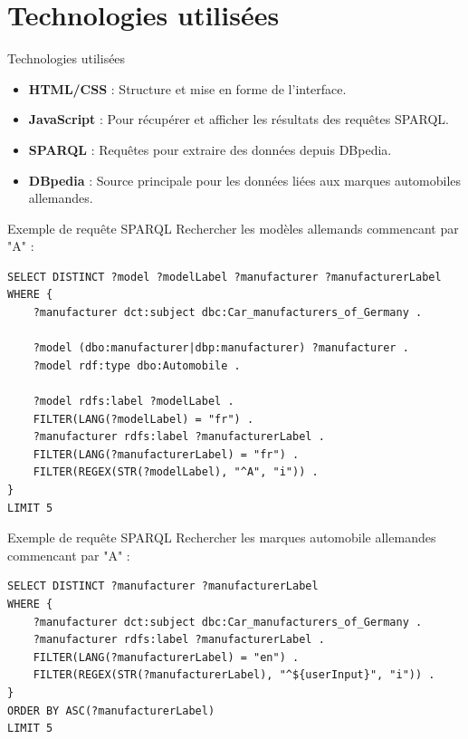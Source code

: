 \documentclass[10pt]{beamer}
\begin{document}
\section{Technologies utilisées}
\begin{frame}{Technologies utilisées}
\begin{itemize}
    \item \textbf{HTML/CSS} : Structure et mise en forme de l'interface.  
    \item \textbf{JavaScript} : Pour récupérer et afficher les résultats des requêtes SPARQL.  
    \item \textbf{SPARQL} : Requêtes pour extraire des données depuis DBpedia.  
    \item \textbf{DBpedia} : Source principale pour les données liées aux marques automobiles allemandes.  
\end{itemize}
\end{frame}

\begin{frame}[fragile]{Exemple de requête SPARQL}
Rechercher les modèles allemands commencant par "A" :
{\footnotesize
\begin{verbatim}
SELECT DISTINCT ?model ?modelLabel ?manufacturer ?manufacturerLabel
WHERE {
    ?manufacturer dct:subject dbc:Car_manufacturers_of_Germany .

    ?model (dbo:manufacturer|dbp:manufacturer) ?manufacturer .
    ?model rdf:type dbo:Automobile .

    ?model rdfs:label ?modelLabel .
    FILTER(LANG(?modelLabel) = "fr") .
    ?manufacturer rdfs:label ?manufacturerLabel .
    FILTER(LANG(?manufacturerLabel) = "fr") .
    FILTER(REGEX(STR(?modelLabel), "^A", "i")) .
}
LIMIT 5
\end{verbatim}
}
\end{frame}

\begin{frame}[fragile]{Exemple de requête SPARQL}
Rechercher les marques automobile allemandes commencant par "A" :  
{\footnotesize
\begin{verbatim}
SELECT DISTINCT ?manufacturer ?manufacturerLabel 
WHERE {
    ?manufacturer dct:subject dbc:Car_manufacturers_of_Germany .
    ?manufacturer rdfs:label ?manufacturerLabel .
    FILTER(LANG(?manufacturerLabel) = "en") .
    FILTER(REGEX(STR(?manufacturerLabel), "^${userInput}", "i")) .
}
ORDER BY ASC(?manufacturerLabel) 
LIMIT 5
\end{verbatim}
}
\end{frame}
\end{document}
